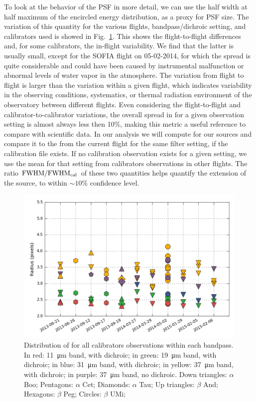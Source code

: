 To look at the behavior of the PSF in more detail, we can use the half width at half maximum of the encircled energy distribution, \Rfifty as a proxy for PSF size. The variation of this quantity for the various flights, bandpass/dichroic setting, and calibrators used is showed in Fig.~\ref{fig:Rfiftydist}. This shows the flight-to-flight differences and, for some calibrators, the in-flight variability. We find that the latter is usually small, except for the SOFIA flight on 05-02-2014, for which the spread is quite considerable and could have been caused by instrumental malfunction or abnormal levels of water vapor in the atmosphere. The variation from flight to flight is larger than the variation within a given flight, which indicates variability in the observing conditions, systematics, or thermal radiation environment of the observatory between different flights. Even considering the flight-to-flight and calibrator-to-calibrator variations, the overall spread in \Rfifty for a given observation setting is almost always less then 10\%, making this metric a useful reference to compare with scientific data. In our analysis we will compute \Rfifty for our sources and compare it to the \Rfifty from the current flight for the same filter setting, if the calibration file exists. If no calibration observation exists for a given setting, we use the mean \Rfifty for that setting from calibrators observations in other flights. The ratio $\textrm{FWHM}/\textrm{FWHM}_\textrm{cal}$ of these two quantities helps quantify the extension of the source, to within $\sim 10\%$ confidence level. 

\begin{figure}[!h]
\begin{center}
\includegraphics[width=\textwidth]{Figures/R50.png}
\vspace{-0.5cm}

\caption[PSF size of calibrators]{Distribution of \Rfifty for all calibrators observations within each bandpass. In red: \SI{11}{\um} band, with dichroic; in green: \SI{19}{\um} band, with dichroic; in blue: \SI{31}{\um} band, with dichroic; in yellow: \SI{37}{\um} band, with dichroic; in purple: \SI{37}{\um} band, no dichroic. Down triangles: $\alpha$ Boo; Pentagons: $\alpha$ Cet; Diamonds: $\alpha$ Tau;  Up triangles: $\beta$ And; Hexagons: $\beta$ Peg; Circles: $\beta$ UMi;}
\label{fig:Rfiftydist}
\end{center}
\end{figure}

